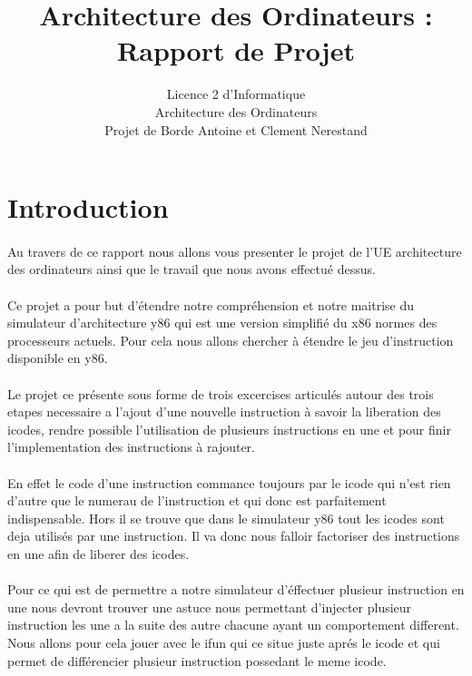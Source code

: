 \documentclass[12pt]{article}
\title{Architecture des Ordinateurs : Rapport de Projet}
\author{Licence 2 d'Informatique\\ 
  Architecture des Ordinateurs\\
  Projet de Borde Antoine et Clement Nerestand}
\begin{document}
\maketitle

\newpage

\tableofcontents

\newpage

\section*{Introduction}

\paragraph{} Au travers de ce rapport nous allons vous presenter le projet
 de l'UE architecture des ordinateurs ainsi que le travail que nous avons 
 effectué dessus.

\paragraph{} Ce projet a pour but d'étendre notre compréhension et notre 
maitrise du simulateur d'architecture y86 qui est une version simplifié
du x86 normes des processeurs actuels. Pour cela nous allons chercher à 
étendre le jeu d'instruction disponible en y86.

\paragraph{} Le projet ce présente sous forme de trois excercises
articulés autour des trois etapes
necessaire a l'ajout d'une nouvelle instruction à savoir la liberation
des icodes, rendre possible l'utilisation de plusieurs instructions en
une et pour finir l'implementation des instructions à rajouter.

\paragraph{} En effet le code d'une instruction commance toujours par le
 icode qui n'est rien d'autre que le numerau de l'instruction et qui
 donc est parfaitement indispensable. Hors il se trouve que dans le simulateur
 y86 tout les icodes sont deja utilisés par une instruction. Il va donc nous
 falloir factoriser des instructions en une afin de liberer des icodes.

\paragraph{} Pour ce qui est de permettre a notre simulateur d'éffectuer
plusieur instruction en une nous devront trouver une astuce nous permettant
d'injecter plusieur instruction les une a la suite des autre chacune ayant un
comportement different. Nous allons pour cela jouer avec le ifun qui ce situe
juste aprés le icode et qui permet de différencier plusieur instruction possedant le meme icode.
\end{document}
